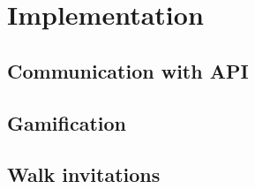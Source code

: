 \chapter{Implementation}


\section{Communication with API}

\section{Gamification}

\section{Walk invitations}